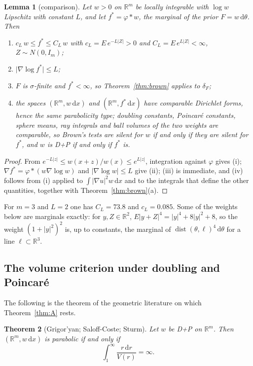 \documentclass[11pt]{amsart}
\newcommand{\R}{\mathbb{R}}
\newcommand{\dd}{\,\mathrm{d}}
\newcommand{\abs}[1]{\lvert #1\rvert}
\DeclareMathOperator{\dist}{dist}
\theoremstyle{plain}
\newtheorem{theorem}{Theorem}[section]
\newtheorem{lemma}[theorem]{Lemma}
\theoremstyle{definition}
\theoremstyle{remark}
\begin{document}
\begin{lemma}[comparison]\label{lem:lip}
Let $w>0$ on $\R^m$ be locally integrable with $\log w$ Lipschitz with constant
$L$, and let $f^*=\varphi*w$, the marginal of the prior $F=w\dd\theta$. Then
\begin{enumerate}[label=\textup{(\roman*)},leftmargin=2em,itemsep=1pt]
\item $c_L\,w\le f^*\le C_L\,w$ with $c_L=E\,e^{-L\abs Z}>0$ and
$C_L=E\,e^{L\abs Z}<\infty$, $Z\sim N(0,I_m)$;
\item $\abs{\nabla\log f^*}\le L$;
\item $F$ is $\sigma$-finite and $f^*<\infty$, so Theorem~\ref{thm:brown}
applies to $\delta_F$;
\item the spaces $(\R^m,w\dd x)$ and $(\R^m,f^*\dd x)$ have comparable Dirichlet
forms, hence the same parabolicity type; doubling constants, Poincar\'e
constants, sphere means, ray integrals and ball volumes of the two weights are
comparable, so Brown's tests are silent for $w$ if and only if they are silent
for $f^*$, and $w$ is D+P if and only if $f^*$ is.
\end{enumerate}
\end{lemma}

\begin{proof}
From $e^{-L\abs z}\le w(x+z)/w(x)\le e^{L\abs z}$, integration against
$\varphi$ gives (i); $\nabla f^*=\varphi*(w\nabla\log w)$ and
$\abs{\nabla\log w}\le L$ give (ii); (iii) is immediate, and (iv) follows from
(i) applied to $\int\abs{\nabla u}^2w\dd x$ and to the integrals that define the
other quantities, together with Theorem~\ref{thm:brown}(a).
\end{proof}

For $m=3$ and $L=2$ one has $C_L=73.8$ and $c_L=0.085$. Some of the weights
below are marginals exactly: for $y,Z\in\R^2$,
$E\abs{y+Z}^4=\abs y^4+8\abs y^2+8$, so the weight $(1+\abs y^2)^2$ is, up to
constants, the marginal of $\dist(\theta,\ell)^4\dd\theta$ for a line
$\ell\subset\R^3$.

\subsection{The volume criterion under doubling and Poincar\'e}
The following is the theorem of the geometric literature on which
Theorem~\ref{thm:A} rests.

\begin{theorem}[Grigor'yan; Saloff-Coste; Sturm]\label{thm:volume}
Let $w$ be D+P on $\R^m$. Then $(\R^m,w\dd x)$ is parabolic if and only if
\begin{equation}\label{eq:volume}
\int_1^\infty\frac{r\dd r}{V(r)}=\infty .
\end{equation}
\end{theorem}
\end{document}
